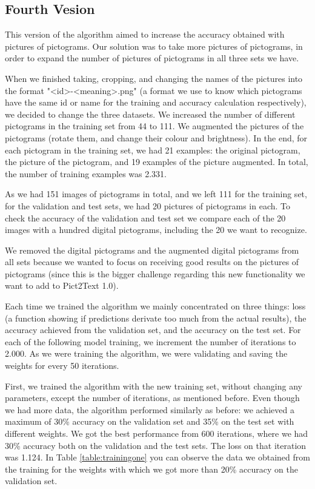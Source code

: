 \subsection{Fourth Vesion}
\label{Fourth Iteration of the One-shot model}

This version of the algorithm aimed to increase the accuracy obtained with pictures of pictograms. Our solution was to take more pictures of pictograms, in order to expand the number of pictures of pictograms in all three sets we have.

When we finished taking, cropping, and changing the names of the pictures into the format "<id>-<meaning>.png" (a format we use to know which pictograms have the same id or name for the training and accuracy calculation respectively), we decided to change the three datasets. We increased the number of different pictograms in the training set from 44 to 111. We augmented the pictures of the pictograms (rotate them, and change their colour and brightness). In the end, for each pictogram in the training set, we had 21 examples: the original pictogram, the picture of the pictogram, and 19 examples of the picture augmented. In total, the number of training examples was 2.331.

As we had 151 images of pictograms in total, and we left 111 for the training set, for the validation and test sets, we had 20 pictures of pictograms in each. To check the accuracy of the validation and test set we compare each of the 20 images with a hundred digital pictograms, including the 20 we want to recognize. 

We removed the digital pictograms and the augmented digital pictograms from all sets because we wanted to focus on receiving good results on the pictures of pictograms (since this is the bigger challenge regarding this new functionality we want to add to Pict2Text 1.0).

Each time we trained the algorithm we mainly concentrated on three things: loss (a function showing if predictions derivate too much from the actual results), the accuracy achieved from the validation set, and the accuracy on the test set. For each of the following model training, we increment the number of iterations to 2.000. As we were training the algorithm, we were validating and saving the weights for every 50 iterations.

First, we trained the algorithm with the new training set, without changing any parameters, except the number of iterations, as mentioned before. Even though we had more data, the algorithm performed similarly as before: we achieved a maximum of 30\% accuracy on the validation set and 35\% on the test set with different weights. We got the best performance from 600 iterations, where we had 30\% accuracy both on the validation and the test sets. The loss on that iteration was 1.124. In Table \ref{table:trainingone} you can observe the data we obtained from the training for the weights with which we got more than 20\% accuracy on the validation set.


